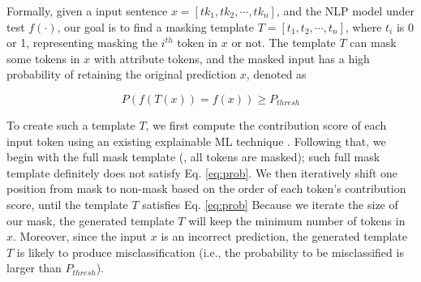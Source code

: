 Formally, given a input sentence $x = [tk_1, tk_2, \cdots, tk_n]$, and the NLP model under test $f(\cdot)$, our goal is to find a masking template $T = [t_1, t_2, \cdots, t_n]$, where $t_i$ is 0 or 1, representing masking the $i^{th}$ token in $x$ or not.
The template $T$ can mask some tokens in $x$ with attribute tokens, and the masked input has a high probability of retaining the original prediction $x$, denoted as 

\begin{equation}
    P(f(T(x)) = f(x)) \ge P_{thresh}
    \label{eq:prob}
\end{equation}


To create such a template $T$, we first compute the contribution score of each input token using an existing explainable ML technique \cite{}. Following that, we begin with the full mask template (\ie, all tokens are masked); such full mask template definitely does not satisfy Eq. \ref{eq:prob}.
We then iteratively shift one position from mask to non-mask based on the order of each token's contribution score, until the template $T$ satisfies Eq. \ref{eq:prob}
Because we iterate the size of our mask, the generated template $T$ will keep the minimum number of tokens in $x$. Moreover, since the input $x$ is an incorrect prediction, the generated template $T$ is likely to produce misclassification (i.e., the probability to be misclassified is larger than $P_{thresh}$).



% 











%








